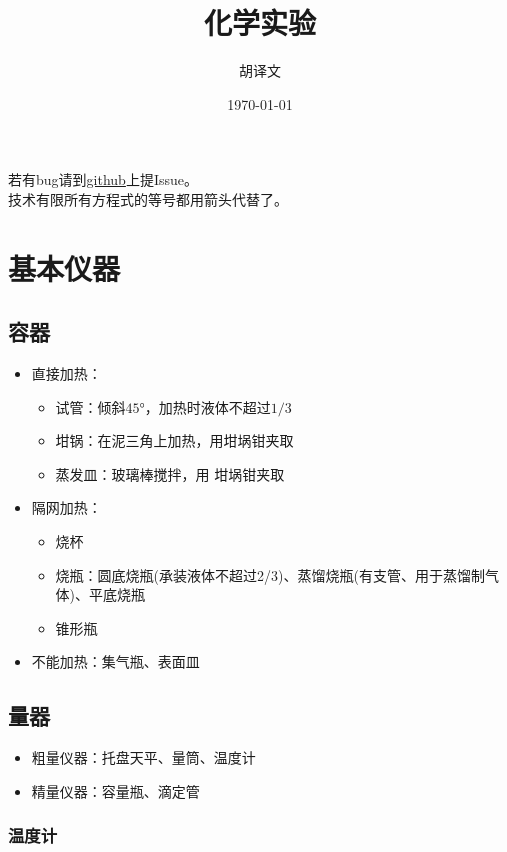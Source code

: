 \documentclass[a4paper]{article}
\title{化学实验}
\author{胡译文}
\date{\today}
\renewcommand\contentsname{目录}
\begin{document}
	\maketitle
	\begin{center}
		若有bug请到{\color{red}\href{https://github.com/huyiwen/Chem}{github}}上提Issue。\\
		技术有限所有方程式的等号都用箭头代替了。
	\end{center}
	\renewcommand\contentsname{目录}
	\tableofcontents
	
	
	\clearpage
	\section{基本仪器}
	
	
	\subsection{容器}
	\begin{itemize}
		\item 直接加热：
			\begin{itemize}
			\item 试管：倾斜$\ang{45}$，加热时液体不超过$1/3$
			\item 坩锅：在泥三角上加热，用坩埚钳夹取
			\item 蒸发皿：玻璃棒搅拌，用 坩埚钳夹取
			\end{itemize}
		\item 隔网加热：
			\begin{itemize}
			\item 烧杯
			\item 烧瓶：圆底烧瓶(承装液体不超过2/3)、蒸馏烧瓶(有支管、用于蒸馏制气体)、平底烧瓶
			\item 锥形瓶
			\end{itemize}
		\item 不能加热：集气瓶、表面皿
	\end{itemize}
	
	
	\subsection{量器}
	\begin{itemize}
		\item 粗量仪器：托盘天平、量筒、温度计
		\item 精量仪器：容量瓶、滴定管
	\end{itemize}
	
	\subsubsection{温度计}
\end{document}
